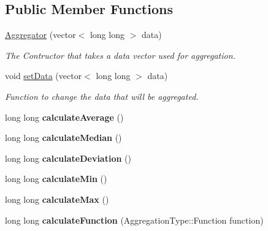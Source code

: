 \subsection*{Public Member Functions}
\begin{DoxyCompactItemize}
\item 
\hypertarget{classAggregator_ad1851feffdd4cf393ee1069f05d4d894}{\hyperlink{classAggregator_ad1851feffdd4cf393ee1069f05d4d894}{Aggregator} (vector$<$ long long $>$ data)}\label{classAggregator_ad1851feffdd4cf393ee1069f05d4d894}

\begin{DoxyCompactList}\small\item\em The Contructor that takes a data vector used for aggregation. \end{DoxyCompactList}\item 
void \hyperlink{classAggregator_a818c9a4039891423f33cfe2451a6c086}{set\-Data} (vector$<$ long long $>$ data)
\begin{DoxyCompactList}\small\item\em Function to change the data that will be aggregated. \end{DoxyCompactList}\item 
\hypertarget{classAggregator_aea8fb2b17cf86d2cb47c0b595c88a025}{long long {\bfseries calculate\-Average} ()}\label{classAggregator_aea8fb2b17cf86d2cb47c0b595c88a025}

\item 
\hypertarget{classAggregator_a6c7a0bcead8e8e3b06b278821f031e97}{long long {\bfseries calculate\-Median} ()}\label{classAggregator_a6c7a0bcead8e8e3b06b278821f031e97}

\item 
\hypertarget{classAggregator_abc3f6ff915ee262dba7b71490256ac45}{long long {\bfseries calculate\-Deviation} ()}\label{classAggregator_abc3f6ff915ee262dba7b71490256ac45}

\item 
\hypertarget{classAggregator_ae9b1e7725268c01798f92a3123cf44c1}{long long {\bfseries calculate\-Min} ()}\label{classAggregator_ae9b1e7725268c01798f92a3123cf44c1}

\item 
\hypertarget{classAggregator_a349bbbf90f25e53eb5904e969381a8db}{long long {\bfseries calculate\-Max} ()}\label{classAggregator_a349bbbf90f25e53eb5904e969381a8db}

\item 
\hypertarget{classAggregator_ac52133786a16d6590b7d6518d19322e8}{long long {\bfseries calculate\-Function} (Aggregation\-Type\-::\-Function function)}\label{classAggregator_ac52133786a16d6590b7d6518d19322e8}

\end{DoxyCompactItemize}
